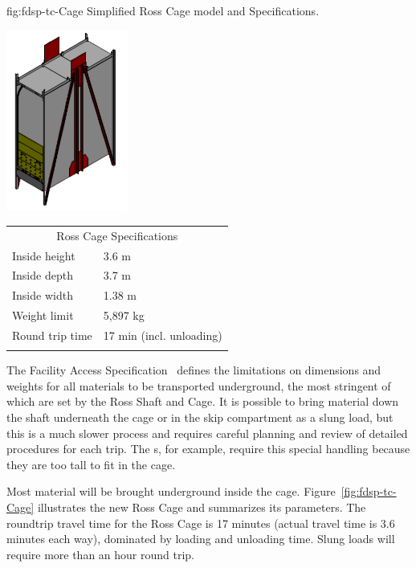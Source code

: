\begin{dunefigure}
{fig:fdsp-tc-Cage}
{Simplified Ross Cage model and Specifications.}
\parbox{2.1in}{\includegraphics[width=0.3\textwidth]{graphics/Cage-view.pdf}}
\qquad\hspace{10pt}
\begin{minipage}{0.5\textwidth}%
\begin{tabular}{p{3.4cm}p{3.4cm}}        
\multicolumn{2}{c}{Ross Cage Specifications}\\ \toprowrule
Inside height & 3.6 m\\ \colhline
Inside depth  & 3.7 m \\ \colhline
Inside width  & 1.38 m \\ \colhline
Weight limit  &  5,897 kg \\ \colhline
Round trip \newline time & 17 min \newline (incl. unloading) \\ \colhline
\end{tabular}
\end{minipage}
\end{dunefigure}

The  Facility Access Specification~\cite{bib:docdb328} defines the limitations on dimensions and weights for all materials to be transported underground, the most stringent of which are set by the Ross Shaft and Cage. 
It is possible to bring material down the shaft underneath the cage or in the skip compartment  as a slung load, but this is a much slower process and requires careful planning 
and review of detailed procedures for each trip. 
The  s, for example, require this special handling because they are too tall to fit in the cage. 

Most material will be brought underground inside the cage. Figure~\ref{fig:fdsp-tc-Cage} illustrates the new Ross Cage and summarizes its parameters.  
The roundtrip travel time for the Ross Cage is 17 minutes (actual travel time is \num{3.6} minutes each way), dominated by loading and unloading time.  
Slung loads will require more than an hour round trip.



